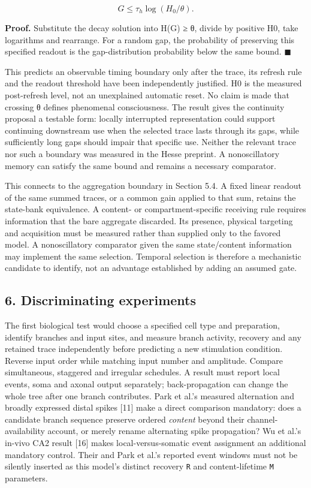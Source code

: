 \documentclass[
  american,
  11pt,
  letterpaper,
]{article}
\begin{document}
\[
G\leq\tau_h\log(H_0/\theta). \tag{11}
\]

\textbf{Proof.} Substitute the decay solution into H(G) ≥ θ, divide by positive H0, take logarithms and rearrange. For a random gap, the probability of preserving this specified readout is the gap-distribution probability below the same bound. \(\blacksquare\)

This predicts an observable timing boundary only after the trace, its refresh rule and the readout threshold have been independently justified. H0 is the measured post-refresh level, not an unexplained automatic reset. No claim is made that crossing θ defines phenomenal consciousness. The result gives the continuity proposal a testable form: locally interrupted representation could support continuing downstream use when the selected trace lasts through its gaps, while sufficiently long gaps should impair that specific use. Neither the relevant trace nor such a boundary was measured in the Hesse preprint. A nonoscillatory memory can satisfy the same bound and remains a necessary comparator.

This connects to the aggregation boundary in Section 5.4. A fixed linear readout of the same summed traces, or a common gain applied to that sum, retains the state-bank equivalence. A content- or compartment-specific receiving rule requires information that the bare aggregate discarded. Its presence, physical targeting and acquisition must be measured rather than supplied only to the favored model. A nonoscillatory comparator given the same state/content information may implement the same selection. Temporal selection is therefore a mechanistic candidate to identify, not an advantage established by adding an assumed gate.

\subsection{6. Discriminating experiments}\label{discriminating-experiments}

The first biological test would choose a specified cell type and preparation, identify branches and input sites, and measure branch activity, recovery and any retained trace independently before predicting a new stimulation condition. Reverse input order while matching input number and amplitude. Compare simultaneous, staggered and irregular schedules. A result must report local events, soma and axonal output separately; back-propagation can change the whole tree after one branch contributes. Park et al.'s measured alternation and broadly expressed distal spikes {[}11{]} make a direct comparison mandatory: does a candidate branch sequence preserve ordered \emph{content} beyond their channel-availability account, or merely rename alternating spike propagation? Wu et al.'s in-vivo CA2 result {[}16{]} makes local-versus-somatic event assignment an additional mandatory control. Their and Park et al.'s reported event windows must not be silently inserted as this model's distinct recovery \texttt{R} and content-lifetime \texttt{M} parameters.
\end{document}
